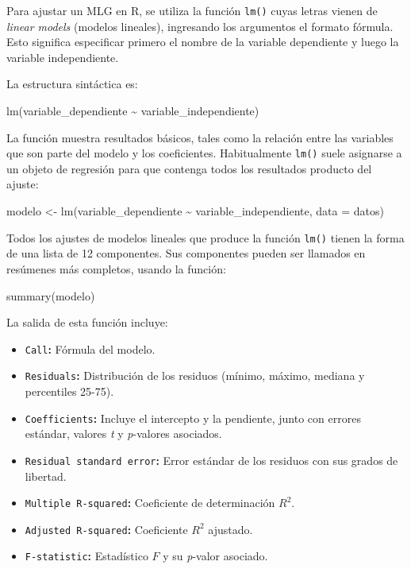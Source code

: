 \documentclass[
  spanish,
  a4paper,
]{scrbook}
\newenvironment{Shaded}{\begin{snugshade}}{\end{snugshade}}
\newcommand{\AttributeTok}[1]{\textcolor[rgb]{0.40,0.45,0.13}{#1}}
\newcommand{\FunctionTok}[1]{\textcolor[rgb]{0.28,0.35,0.67}{#1}}
\newcommand{\NormalTok}[1]{\textcolor[rgb]{0.00,0.23,0.31}{#1}}
\newcommand{\OtherTok}[1]{\textcolor[rgb]{0.00,0.23,0.31}{#1}}
\newcommand{\SpecialCharTok}[1]{\textcolor[rgb]{0.37,0.37,0.37}{#1}}
\begin{document}
Para ajustar un MLG en R, se utiliza la función \texttt{lm()} cuyas
letras vienen de \emph{linear models} (modelos lineales), ingresando los
argumentos el formato fórmula. Esto significa especificar primero el
nombre de la variable dependiente y luego la variable independiente.

La estructura sintáctica es:

\begin{Shaded}
\begin{Highlighting}[]
\FunctionTok{lm}\NormalTok{(variable\_dependiente }\SpecialCharTok{\textasciitilde{}}\NormalTok{ variable\_independiente)}
\end{Highlighting}
\end{Shaded}

La función muestra resultados básicos, tales como la relación entre las
variables que son parte del modelo y los coeficientes. Habitualmente
\texttt{lm()} suele asignarse a un objeto de regresión para que contenga
todos los resultados producto del ajuste:

\begin{Shaded}
\begin{Highlighting}[]
\NormalTok{modelo }\OtherTok{\textless{}{-}} \FunctionTok{lm}\NormalTok{(variable\_dependiente }\SpecialCharTok{\textasciitilde{}}\NormalTok{ variable\_independiente, }\AttributeTok{data =}\NormalTok{ datos)}
\end{Highlighting}
\end{Shaded}

Todos los ajustes de modelos lineales que produce la función
\texttt{lm()} tienen la forma de una lista de 12 componentes. Sus
componentes pueden ser llamados en resúmenes más completos, usando la
función:

\begin{Shaded}
\begin{Highlighting}[]
\FunctionTok{summary}\NormalTok{(modelo)}
\end{Highlighting}
\end{Shaded}

La salida de esta función incluye:

\begin{itemize}
\item
  \texttt{Call}\textbf{:} Fórmula del modelo.
\item
  \texttt{Residuals}\textbf{:} Distribución de los residuos (mínimo,
  máximo, mediana y percentiles 25-75).
\item
  \texttt{Coefficients}\textbf{:} Incluye el intercepto y la pendiente,
  junto con errores estándar, valores \emph{t} y \emph{p}-valores
  asociados.
\item
  \texttt{Residual\ standard\ error}\textbf{:} Error estándar de los
  residuos con sus grados de libertad.
\item
  \texttt{Multiple\ R-squared}\textbf{:} Coeficiente de determinación
  \(R^2\).
\item
  \texttt{Adjusted\ R-squared}\textbf{:} Coeficiente \(R^2\) ajustado.
\item
  \texttt{F-statistic}\textbf{:} Estadístico \(F\) y su \emph{p}-valor
  asociado.
\end{itemize}
\end{document}
